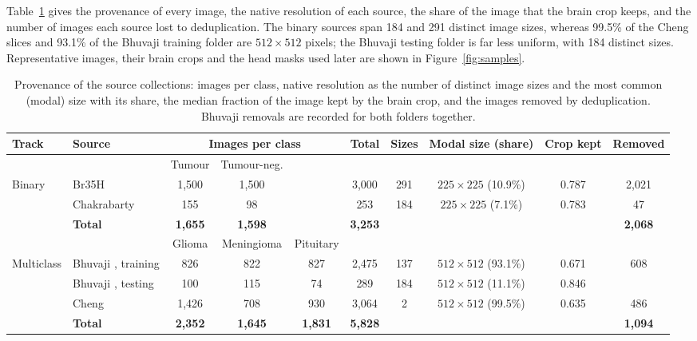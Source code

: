 \documentclass[final,3p,times,number]{elsarticle}
\begin{document}
Table~\ref{tab:provenance} gives the provenance of every image, the native resolution of each source, the share of the image that the brain crop keeps, and the number of images each source lost to deduplication. The binary sources span 184 and 291 distinct image sizes, whereas 99.5\% of the Cheng slices and 93.1\% of the Bhuvaji training folder are $512\times 512$ pixels; the Bhuvaji testing folder is far less uniform, with 184 distinct sizes. Representative images, their brain crops and the head masks used later are shown in Figure~\ref{fig:samples}.

\begin{table}[htbp]
\centering
\caption{Provenance of the source collections: images per class, native resolution as the number of distinct image sizes and the most common (modal) size with its share, the median fraction of the image kept by the brain crop, and the images removed by deduplication. Bhuvaji removals are recorded for both folders together.}
\label{tab:provenance}
\small
\setlength{\tabcolsep}{3pt}
\begin{tabular*}{\textwidth}{@{\extracolsep{\fill}}llcccccccc@{}}
\toprule
Track & Source & \multicolumn{3}{c}{Images per class} & Total & Sizes & Modal size (share) & Crop kept & Removed \\
\midrule
 & & Tumour & Tumour-neg. & & & & & & \\
\cmidrule(lr){3-4}
\multirow{3}{*}{Binary} & Br35H \cite{ds2} & 1,500 & 1,500 & & 3,000 & 291 & $225\times 225$ (10.9\%) & 0.787 & 2,021 \\
 & Chakrabarty \cite{ds1} & 155 & 98 & & 253 & 184 & $225\times 225$ (7.1\%) & 0.783 & 47 \\
 & \textbf{Total} & \textbf{1,655} & \textbf{1,598} & & \textbf{3,253} & & & & \textbf{2,068} \\
\midrule
 & & Glioma & Meningioma & Pituitary & & & & & \\
\cmidrule(lr){3-5}
\multirow{4}{*}{Multiclass} & Bhuvaji \cite{ds3}, training & 826 & 822 & 827 & 2,475 & 137 & $512\times 512$ (93.1\%) & 0.671 & \multirow{2}{*}{608} \\
 & Bhuvaji \cite{ds3}, testing & 100 & 115 & 74 & 289 & 184 & $512\times 512$ (11.1\%) & 0.846 & \\
 & Cheng \cite{ds4,ds5} & 1,426 & 708 & 930 & 3,064 & 2 & $512\times 512$ (99.5\%) & 0.635 & 486 \\
 & \textbf{Total} & \textbf{2,352} & \textbf{1,645} & \textbf{1,831} & \textbf{5,828} & & & & \textbf{1,094} \\
\bottomrule
\end{tabular*}
\end{table}
\end{document}
